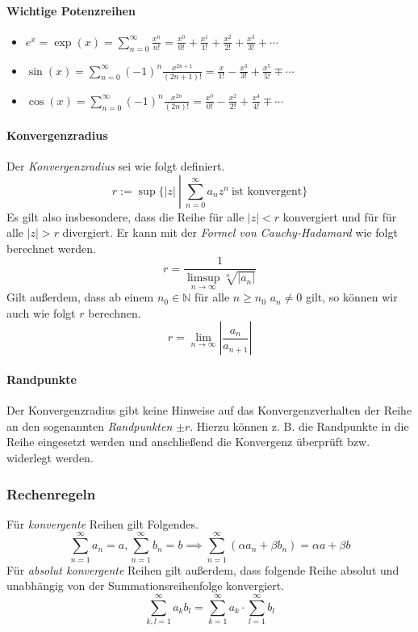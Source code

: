 \documentclass[a4paper, 9pt, DIV=24]{scrartcl}
\newcommand{\N}{\mathbb{N}}
\begin{document}
\paragraph{Wichtige Potenzreihen}

\begin{itemize}
 \item $ e^x = \exp(x) = \sum_{n=0}^\infty \frac{x^n}{n!} = \frac{x^0}{0!} + \frac{x^1}{1!} + \frac{x^2}{2!} + \frac{x^3}{3!} + \cdots $
\item $ \sin (x) = \sum_{n=0}^\infty (-1)^n\frac{x^{2n+1}}{(2n+1)!} = \frac{x}{1!}-\frac{x^3}{3!}+\frac{x^5}{5!}\mp\cdots $
\item $ \cos (x) = \sum_{n=0}^\infty (-1)^n\frac{x^{2n}}{(2n)!} = \frac{x^0}{0!}-\frac{x^2}{2!}+\frac{x^4}{4!}\mp\cdots $
\end{itemize}


\paragraph{Konvergenzradius} Der \emph{Konvergenzradius} sei wie folgt definiert.
\[ r:=\sup \{ |z|\ \left|\ \sum_{n=0}^{\infty}a_n z^n\ \text{ist konvergent}\right.\}\]
Es gilt also insbesondere, dass die Reihe für alle $|z| < r$ konvergiert und für für alle $|z| > r$ divergiert.
Er kann mit der \emph{Formel von Cauchy-Hadamard} wie folgt berechnet werden.
\[ r = \frac{1}{\limsup_{n\to\infty} \sqrt[n]{|a_n|}} \]
Gilt außerdem, dass ab einem $n_0\in\N$ für alle $n \geq n_0$ $a_n \neq 0$ gilt, so können wir auch wie folgt $r$ berechnen.
\[ r = \lim_{n\to\infty} \left | \frac{a_n}{a_{n+1}} \right | \]

\paragraph{Randpunkte}
Der Konvergenzradius gibt keine Hinweise auf das Konvergenzverhalten der Reihe an den sogenannten \emph{Randpunkten} $\pm r$.
Hierzu können z. B. die Randpunkte in die Reihe eingesetzt werden und anschließend die Konvergenz überprüft bzw. widerlegt werden.

\subsubsection{Rechenregeln}
Für \emph{konvergente} Reihen gilt Folgendes.
\[
  \sum_{n=1}^\infty a_n = a, \sum_{n=1}^\infty b_n = b \implies
  \sum_{n=1}^\infty (\alpha a_n + \beta b_n) = \alpha a + \beta b
\]
Für \emph{absolut konvergente} Reihen gilt außerdem, dass folgende Reihe absolut und unabhängig von der Summationsreihenfolge konvergiert.
\[
  \sum_{k,l=1}^\infty a_k b_l = \sum_{k=1}^\infty a_k \cdot \sum_{l=1}^\infty b_l
\]
\end{document}
